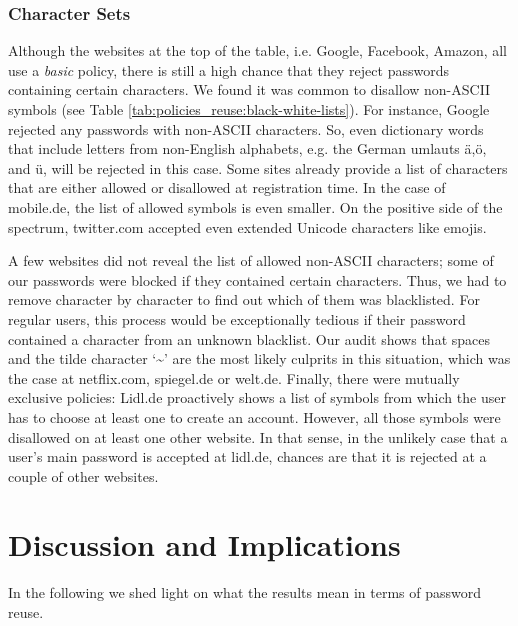 \subsubsection{Character Sets}
Although the websites at the top of the table, i.e. Google, Facebook, Amazon, all use a \textit{basic} policy, there is still a high chance that they reject passwords containing certain characters. We found it was common to disallow non-ASCII symbols (see Table \ref{tab:policies_reuse:black-white-lists}). For instance, Google rejected any passwords with non-ASCII characters. So, even dictionary words that include letters from non-English alphabets, e.g. the German umlauts ä,ö, and ü, will be rejected in this case. Some sites already provide a list of characters that are either allowed or disallowed at registration time. In the case of mobile.de, the list of allowed symbols is even smaller. On the positive side of the spectrum, twitter.com accepted even extended Unicode characters like emojis. 

A few websites did not reveal the list of allowed non-ASCII characters; some of our passwords were blocked if they contained certain characters. Thus, we had to remove character by character to find out which of them was blacklisted. For regular users, this process would be exceptionally tedious if their password contained a character from an unknown blacklist. Our audit shows that spaces and the tilde character `\textasciitilde' are the most likely culprits in this situation, which was the case at netflix.com, spiegel.de or welt.de. Finally, there were mutually exclusive policies: Lidl.de proactively shows a list of symbols from which the user has to choose at least one to create an account. However, all those symbols were disallowed on at least one other website. In that sense, in the unlikely case that a user's main password is accepted at lidl.de, chances are that it is rejected at a couple of other websites. 



\section{Discussion and Implications}
In the following we shed light on what the results mean in terms of password reuse. 
